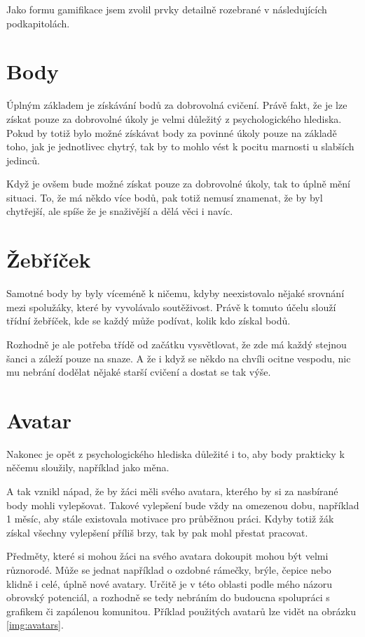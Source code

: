 \documentclass[twoside]{ctuthesis}
\theoremstyle{plain}
\theoremstyle{definition}
\theoremstyle{note}
\begin{document}
Jako formu gamifikace jsem zvolil prvky detailně rozebrané v následujících podkapitolách.


\section{Body}
Úplným základem je získávání bodů za dobrovolná cvičení. Právě fakt, že je lze získat pouze za dobrovolné úkoly je velmi důležitý z psychologického hlediska. Pokud by totiž bylo možné získávat body za povinné úkoly pouze na základě toho, jak je jednotlivec chytrý, tak by to mohlo vést k pocitu marnosti u slabších jedinců.

Když je ovšem bude možné získat pouze za dobrovolné úkoly, tak to úplně mění situaci. To, že má někdo více bodů, pak totiž nemusí znamenat, že by byl chytřejší, ale spíše že je snaživější a dělá věci i navíc. 

\section{Žebříček}
Samotné body by byly víceméně k ničemu, kdyby neexistovalo nějaké srovnání mezi spolužáky, které by vyvolávalo soutěživost. Právě k tomuto účelu slouží třídní žebříček, kde se každý může podívat, kolik kdo získal bodů.

Rozhodně je ale potřeba třídě od začátku vysvětlovat, že zde má každý stejnou šanci a záleží pouze na snaze. A že i když se někdo na chvíli ocitne vespodu, nic mu nebrání dodělat nějaké starší cvičení a dostat se tak výše.

\section{Avatar}
Nakonec je opět z psychologického hlediska důležité i to, aby body prakticky k něčemu sloužily, například jako měna.

A tak vznikl nápad, že by žáci měli svého avatara, kterého by si za nasbírané body mohli vylepšovat. Takové vylepšení bude vždy na omezenou dobu, například 1 měsíc, aby stále existovala motivace pro průběžnou práci. Kdyby totiž žák získal všechny vylepšení příliš brzy, tak by pak mohl přestat pracovat.

Předměty, které si mohou žáci na svého avatara dokoupit mohou být velmi různorodé. Může se jednat například o ozdobné rámečky, brýle, čepice nebo klidně i celé, úplně nové avatary. Určitě je v této oblasti podle mého názoru obrovský potenciál, a rozhodně se tedy nebráním do budoucna spolupráci s grafikem či zapálenou komunitou. Příklad použitých avatarů lze vidět na obrázku \ref{img:avatars}.
\end{document}
